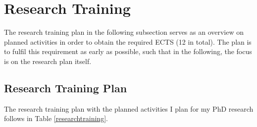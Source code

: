 \section{Research Training}
The research training plan in the following subsection serves as an overview on planned activities in order to obtain the required ECTS (12 in total). The plan is to fulfil this requirement as early as possible, such that in the following, the focus is on the research plan itself.

\subsection{Research Training Plan}
The research training plan with the planned activities I plan for my PhD research follows in Table \ref{researchtraining}.

